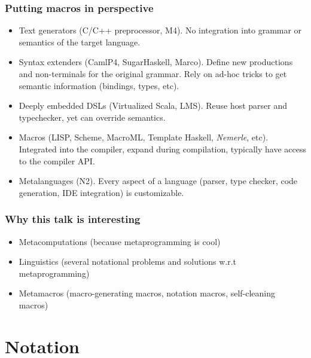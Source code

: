 \documentclass[hyperref={bookmarks=false}]{beamer}
\begin{document}
\begin{frame}[fragile]
\frametitle{Putting macros in perspective}
\begin{itemize}
\item Text generators (C/C++ preprocessor, M4). No integration into grammar or semantics of the target language.
\item Syntax extenders (CamlP4, SugarHaskell, Marco). Define new productions and non-terminals for the original grammar. Rely on ad-hoc tricks to get semantic information (bindings, types, etc).
\item Deeply embedded DSLs (Virtualized Scala, LMS). Reuse host parser and typechecker, yet can override semantics.
\item Macros (LISP, Scheme, MacroML, Template Haskell, \emph{Nemerle}, etc). Integrated into the compiler, expand during compilation, typically have access to the compiler API.
\item Metalanguages (N2). Every aspect of a language (parser, type checker, code generation, IDE integration) is customizable.
\end{itemize}
\end{frame}

\begin{frame}[fragile]
\frametitle{Why this talk is interesting}
\begin{itemize}
\item Metacomputations (because metaprogramming is cool)
\item Linguistics (several notational problems and solutions w.r.t metaprogramming)
\item Metamacros (macro-generating macros, notation macros, self-cleaning macros)
\end{itemize}
\end{frame}

\section{Notation}
\end{document}
